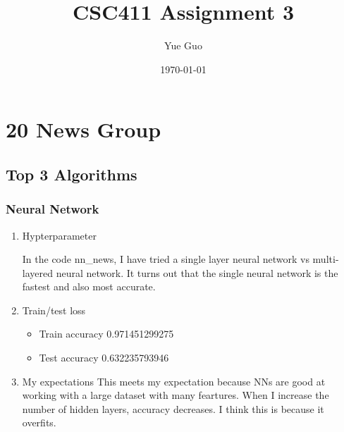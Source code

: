 \documentclass[letterpaper, 12]{article}
\date{\today}
\title{CSC411 Assignment 3}
\author{Yue Guo}
\begin{document}
\maketitle

\section{20 News Group}
\subsection{Top 3 Algorithms}
\subsubsection{Neural Network}
\begin{enumerate}

    \item Hypterparameter
	
	In the code nn\_news, I have tried a single layer neural network vs multi-layered neural network. It turns out that the single neural network is the fastest and also most accurate.

	\item Train/test loss
	\begin{itemize}
     \item  Train accuracy 0.971451299275
     \item Test accuracy 0.632235793946
        \end{itemize}
      \item My expectations
      This meets my expectation because NNs are good at working with a large dataset with many feartures. When I increase the number of hidden layers, accuracy decreases. I think this is because it overfits.
  
\end{enumerate}
\end{document}
